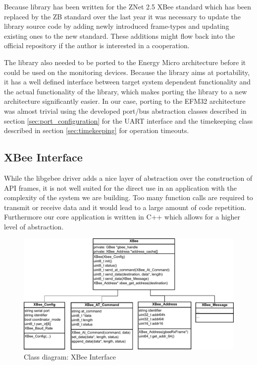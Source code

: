 Because library has been written for the ZNet 2.5 XBee standard which has been replaced by the ZB standard over the last year it was necessary to update the library source code by adding newly introduced frame-types and updating existing ones to the new standard. These additions might flow back into the official repository if the author is interested in a cooperation.

The library also needed to be ported to the Energy Micro architecture before it could be used on the monitoring devices. Because the library aims at portability, it has a well defined interface between target system dependent functionality and the actual functionality of the library, which makes porting the library to a new architecture significantly easier. In our case, porting to the EFM32 architecture was almost trivial using the developed port/bus abstraction classes described in section \ref{sec:port_configuration} for the UART interface and the timekeeping class described in section \ref{sec:timekeeping} for operation timeouts.


\subsection{XBee Interface}
While the libgebee driver adds a nice layer of abstraction over the construction of API frames, it is not well suited for the direct use in an application with the complexity of the system we are building. Too many function calls are required to transmit or receive data and it would lead to a large amount of code repetition.  Furthermore our core application is written in C++ which allows for a higher level of abstraction.

\begin{figure}
\centering
\includegraphics[width=\textwidth]{Images/xbee_interface}
\caption{Class diagram: XBee Interface}
\label{fig:xbee_interface}
\end{figure}

